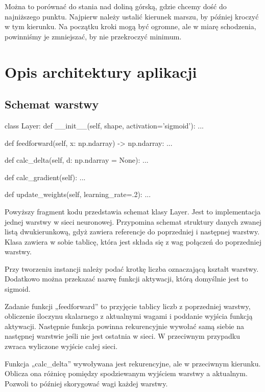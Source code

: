     Można to porównać do stania nad doliną górską, gdzie chcemy dość do najniższego punktu.
    Najpierw należy ustalić kierunek marszu, by później kroczyć w tym kierunku.
    Na początku kroki mogą być ogromne, ale w miarę schodzenia, powinniśmy je zmniejszać, by nie przekroczyć minimum.

    \chapter{Opis architektury aplikacji}\label{ch:opisArchitekturyAplikacji}

    \section{Schemat warstwy}\label{sec:schematWarstwy}

    \begin{python}[caption={Schemat klasy Layer}]
class Layer:
    def __init__(self, shape, activation='sigmoid'):
        ...

    def feedforward(self, x: np.ndarray) -> np.ndarray:
        ...

    def calc_delta(self, d: np.ndarray = None):
        ...

    def calc_gradient(self):
        ...

    def update_weights(self, learning_rate=.2):
        ...
    \end{python}

    Powyższy fragment kodu przedstawia schemat klasy Layer.
    Jest to implementacja jednej warstwy w sieci neuronowej.
    Przypomina schemat struktury danych zwanej listą dwukierunkową, gdyż zawiera referencje do poprzedniej i następnej warstwy.
    Klasa zawiera w sobie tablicę, która jest składa się z wag połączeń do poprzedniej warstwy.

    Przy tworzeniu instancji należy podać krotkę liczba oznaczającą kształt warstwy.
    Dodatkowo można przekazać nazwę funkcji aktywacji, którą domyślnie jest to sigmoid.

    Zadanie funkcji „feedforward” to przyjęcie tablicy liczb z poprzedniej warstwy, obliczenie iloczynu skalarnego z aktualnymi wagami i poddanie wyjścia funkcją aktywacji.
    Następnie funkcja powinna rekurencyjnie wywołać samą siebie na następnej warstwie jeśli nie jest ostatnia w sieci.
    W przeciwnym przypadku zwraca wyliczone wyjście całej sieci.

    Funkcja „calc\_delta” wywoływana jest rekurencyjne, ale w przeciwnym kierunku.
    Oblicza ona różnicę pomiędzy spodziewanym wyjściem warstwy a aktualnym.
    Pozwoli to później skorygować wagi każdej warstwy.

